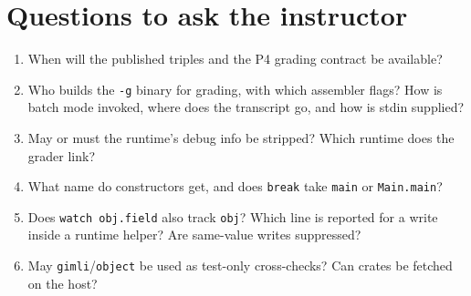 \documentclass[10pt]{article}
\newcommand{\code}[1]{\texttt{\small #1}}
\begin{document}
\section{Questions to ask the instructor}\label{sec:ask}
\begin{enumerate}
\item When will the published triples and the P4 grading contract be available?
\item Who builds the \code{-g} binary for grading, with which assembler flags? How is batch mode invoked, where does the transcript go, and how is stdin supplied?
\item May or must the runtime's debug info be stripped? Which runtime does the grader link?
\item What name do constructors get, and does \code{break} take \code{main} or \code{Main.main}?
\item Does \code{watch obj.field} also track \code{obj}? Which line is reported for a write inside a runtime helper? Are same-value writes suppressed?
\item May \code{gimli}/\code{object} be used as test-only cross-checks? Can crates be fetched on the host?
\end{enumerate}
\end{document}
